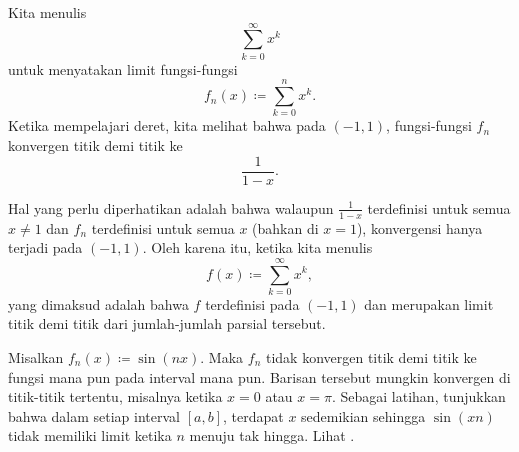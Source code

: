 \begin{example} \label{example:geomsumptconv}
Kita menulis
\begin{equation*}
\sum_{k=0}^\infty x^k
\end{equation*}
untuk menyatakan limit fungsi-fungsi
\begin{equation*}
f_n(x) \coloneqq \sum_{k=0}^n x^k .
\end{equation*}
Ketika mempelajari deret,
kita melihat bahwa pada $(-1,1)$, fungsi-fungsi $f_n$ konvergen titik demi titik ke
\begin{equation*}
\frac{1}{1-x} .
\end{equation*}

Hal yang perlu diperhatikan adalah bahwa walaupun
$\frac{1}{1-x}$ terdefinisi untuk semua $x \neq 1$ dan $f_n$
terdefinisi untuk semua $x$ (bahkan di $x=1$), konvergensi hanya terjadi pada $(-1,1)$.
Oleh karena itu, ketika kita menulis
\begin{equation*}
f(x) \coloneqq \sum_{k=0}^\infty x^k ,
\end{equation*}
yang dimaksud adalah bahwa $f$ terdefinisi pada $(-1,1)$ dan merupakan limit titik demi titik
dari jumlah-jumlah parsial tersebut.
\end{example}

\begin{example}
Misalkan $f_n(x) \coloneqq \sin(nx)$.  Maka $f_n$ tidak konvergen titik demi titik
ke fungsi mana pun pada interval mana pun.  Barisan tersebut mungkin konvergen di titik-titik tertentu, misalnya
ketika $x=0$ atau $x=\pi$.  Sebagai latihan, tunjukkan bahwa dalam setiap interval
$[a,b]$, terdapat $x$ sedemikian sehingga $\sin(xn)$ tidak memiliki limit
ketika $n$ menuju tak hingga.  Lihat .
\begin{myfigureht}
\caption{Grafik $\sin(nx)$ untuk
$n=1,2,\ldots,10$, dengan $n$ yang lebih besar digambar dalam warna abu-abu yang lebih muda.%
\label{fig:nonconvsinxn}}
\end{myfigureht}
\end{example}

